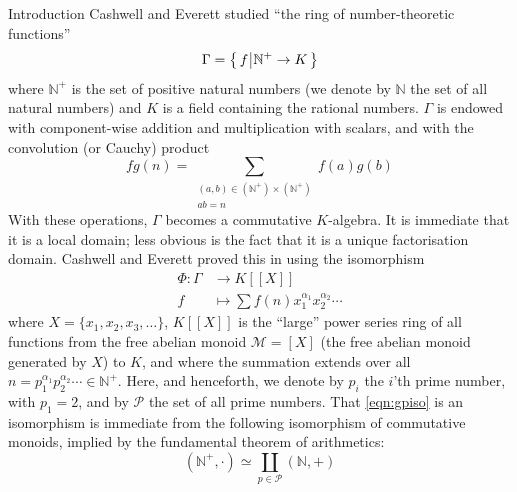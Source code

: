 \documentclass[reqno,10pt]{amsart}
\newcommand{\primes}{\mathcal{P}}
\theoremstyle{definition}
\theoremstyle{remark}
\theoremstyle{plain}
\newcommand{\Nat}{{\mathbb{N}}}
\def\setsuchas#1#2{\left\{\,{#1}\,\vrule\,{#2}\,\right\}}
\newcommand{\set}[1]{{\{#1\}}}
\newcommand{\M}{\mathcal{M}}
\begin{document}
\begin{section}{Introduction}
  Cashwell and Everett \cite{NumThe} studied ``the ring of
  number-theoretic functions'' 
  \begin{equation}
    \label{eq:gammadef}
    \Gamma = \setsuchas{f}{\Nat^+ \to K}
  \end{equation}
  where \(\Nat^+\) is the set of positive natural numbers (we denote
  by \(\Nat\) the set of all natural numbers) and \(K\) is a field
  containing the rational numbers. \(\Gamma\) is endowed with
  component-wise addition and multiplication with scalars, and with
  the convolution (or Cauchy) product
  \begin{equation}\label{eq:convdef}
    fg(n) = \sum_{\substack{(a,b) \in {(\Nat^+)} \times {(\Nat^+)}
    \\ab=n}} 
    f(a)g(b) 
  \end{equation}
  With these operations, \(\Gamma\) becomes a commutative
  \(K\)-algebra. It is immediate that it is a local domain; less
  obvious is the fact that it is a unique factorisation domain. 
  Cashwell and Everett proved this in \cite{NumThe} using the
  isomorphism
  \begin{equation}\label{eqn:gpiso}
    \begin{split}
      \Phi: \Gamma & \to  K[[X]] \\
      f & \mapsto \sum f(n) x_1^{\alpha_1}x_2^{\alpha_2}\cdots
    \end{split}
  \end{equation}
  where \(X=\set{x_1,x_2,x_3,\dots}\), \(K[[X]]\) is the  ``large''
  power series ring of all functions from the free abelian monoid
  \(\M = [X] \) (the free abelian monoid generated by \(X\)) to \(K\),
  and where  
  the summation extends over all
  \(n=p_1^{\alpha_1} p_2^{\alpha_2}\cdots \in \Nat^+\). Here, and
  henceforth, we denote by \(p_i\) the \(i\)'th prime
  number, with \(p_1=2\), and by \(\primes\) the set of all prime
  numbers. That \eqref{eqn:gpiso} is an isomorphism is immediate
  from the following isomorphism of commutative monoids, implied by 
  the fundamental theorem of arithmetics:
  \begin{equation}\label{eqn:fundiso}
    (\Nat^+,\cdot) \simeq \coprod_{p \in \primes}{(\Nat,+)}
  \end{equation}


\end{section}
\end{document}

